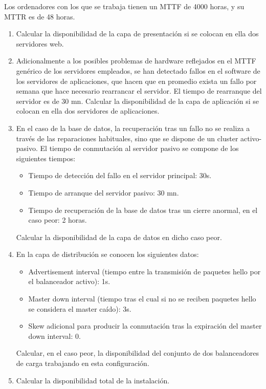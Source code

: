 Los ordenadores con los que se trabaja tienen un MTTF de 4000 horas, y su MTTR es de 48 horas.
\begin{enumerate}
	\item Calcular la disponibilidad de la capa de presentación si se colocan en ella dos servidores web.
	\item Adicionalmente a los posibles problemas de hardware reflejados
en el MTTF genérico de los servidores empleados, se han detectado fallos
 en el software de los servidores de aplicaciones, que hacen que en
promedio exista un fallo por semana que hace necesario rearrancar el
servidor. El tiempo de rearranque del servidor es de 30 mn. Calcular la
disponibilidad de la capa de aplicación si se colocan en ella dos
servidores de aplicaciones.
	\item En el caso de la base de datos, la recuperación tras un fallo
no se realiza a través de las reparaciones habituales, sino que se
dispone de un cluster activo-pasivo. El tiempo de conmutación al
servidor pasivo se compone de los siguientes tiempos:
\begin{itemize}
	\item Tiempo de detección del fallo en el servidor principal: 30s.
	\item Tiempo de arranque del servidor pasivo: 30 mn.
	\item Tiempo de recuperación de la base de datos tras un cierre anormal, en el caso peor: 2 horas.

\end{itemize}

Calcular la disponibilidad de la capa de datos en dicho caso peor.
	\item En la capa de distribución se conocen los siguientes datos:
\begin{itemize}
	\item Advertisement interval (tiempo entre la transmisión de paquetes hello por el balanceador activo): 1s.
	\item Master down interval (tiempo tras el cual si no se reciben paquetes hello se considera el master caído): 3s.
	\item Skew adicional para producir la conmutación tras la expiración del master down interval: 0.

\end{itemize}

Calcular, en el caso peor, la disponibilidad del conjunto de dos balanceadores de carga trabajando en esta configuración.
	\item Calcular la disponibilidad total de la instalación.
\end{enumerate}

\TheSolution
